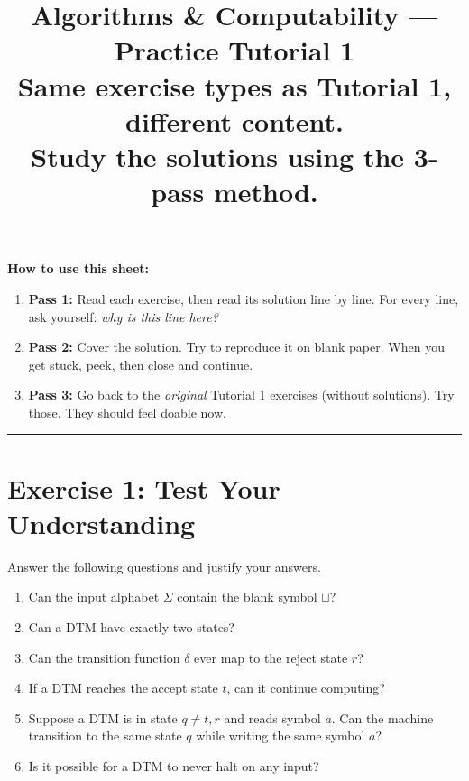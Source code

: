 \documentclass[11pt,a4paper]{article}
\title{\Large\textbf{Algorithms \& Computability --- Practice Tutorial 1}\\[0.3em]
\normalsize Same exercise types as Tutorial 1, different content.\\
Study the solutions using the 3-pass method.}
\date{}
\newcommand{\blank}{\sqcup}
\begin{document}
\maketitle

\noindent\textbf{How to use this sheet:}
\begin{enumerate}
    \item \textbf{Pass 1:} Read each exercise, then read its solution line by line. For every line, ask yourself: \emph{why is this line here?}
    \item \textbf{Pass 2:} Cover the solution. Try to reproduce it on blank paper. When you get stuck, peek, then close and continue.
    \item \textbf{Pass 3:} Go back to the \emph{original} Tutorial 1 exercises (without solutions). Try those. They should feel doable now.
\end{enumerate}

\medskip
\hrule
\bigskip

\section*{Exercise 1: Test Your Understanding}

Answer the following questions and justify your answers.

\begin{enumerate}
    \item Can the input alphabet $\Sigma$ contain the blank symbol $\blank$?

    \item Can a DTM have exactly two states?

    \item Can the transition function $\delta$ ever map to the reject state $r$?

    \item If a DTM reaches the accept state $t$, can it continue computing?

    \item Suppose a DTM is in state $q \neq t, r$ and reads symbol $a$. Can the machine transition to the same state $q$ while writing the same symbol $a$?

    \item Is it possible for a DTM to never halt on any input?
\end{enumerate}
\end{document}

